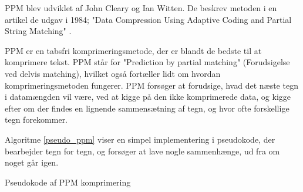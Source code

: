 PPM blev udviklet af John Cleary og Ian Witten. De beskrev metoden i en artikel de udgav i 1984; "Data Compression Using Adaptive Coding and Partial String Matching" \cite{Cleary84datacompression}.

PPM er en tabsfri komprimeringsmetode, der er blandt de bedste til at komprimere tekst. PPM står for "Prediction by partial matching" (Forudsigelse ved delvis matching), hvilket også fortæller lidt om hvordan komprimeringsmetoden fungerer. PPM forsøger at forudsige, hvad det næste tegn i datamængden vil være, ved at kigge på den ikke komprimerede data, og kigge efter om der findes en lignende sammensætning af tegn, og hvor ofte forskellige tegn forekommer. 

Algoritme \ref{pseudo_ppm} viser en simpel implementering i pseudokode, der bearbejder tegn for tegn, og forsøger at lave nogle sammenhænge, ud fra om noget går igen. \cite{ppm_stringology}

\begin{algorithm}[H]
 \SetAlgoLined
\caption{Pseudokode af PPM komprimering \cite{ppm_stringology}}
\label{pseudo_ppm}
\end{algorithm}
